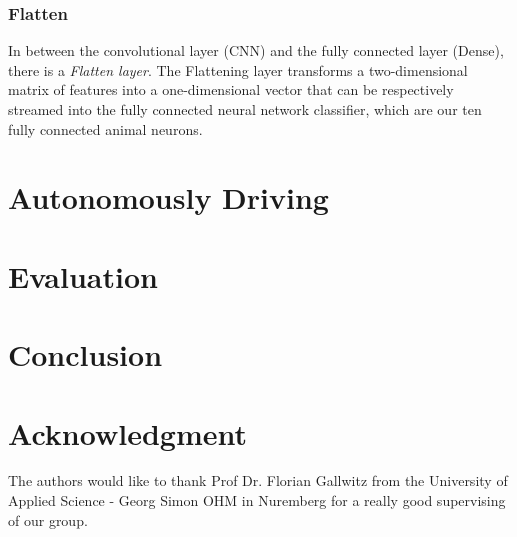 \documentclass[journal]{IEEEtran}
\begin{document}
\subsubsection{Flatten}
In between the convolutional layer (CNN) and the fully connected layer (Dense), there is a \textit{Flatten layer}. The Flattening layer transforms a two-dimensional matrix of features into a one-dimensional vector that can be respectively streamed into the fully connected neural network classifier, which are our ten fully connected animal neurons. \\


\section{Autonomously Driving}

\section{Evaluation}

\section{Conclusion}

\section*{Acknowledgment}
\noindent The authors would like to thank Prof Dr. Florian Gallwitz from the University of Applied Science - Georg Simon OHM in Nuremberg for a really good supervising of our group. 




%
\end{document}
